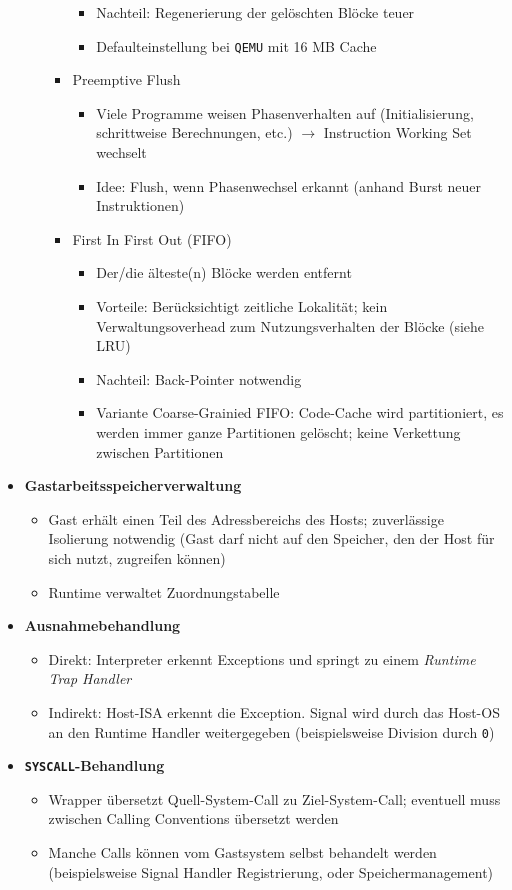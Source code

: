 \begin{itemize}
\begin{itemize}
\begin{itemize}
\begin{itemize}
				\item Nachteil: Regenerierung der gelöschten Blöcke teuer
				\item Defaulteinstellung bei \texttt{QEMU} mit 16 MB Cache
			\end{itemize}
			\item Preemptive Flush
			\begin{itemize}
				\item Viele Programme weisen Phasenverhalten auf (Initialisierung, schrittweise Berechnungen, etc.) \(\rightarrow\) Instruction Working Set wechselt
				\item Idee: Flush, wenn Phasenwechsel erkannt (anhand Burst neuer Instruktionen)
			\end{itemize}
			\item First In First Out (FIFO)
			\begin{itemize}
				\item Der/die älteste(n) Blöcke werden entfernt
				\item Vorteile: Berücksichtigt zeitliche Lokalität; kein Verwaltungsoverhead zum Nutzungsverhalten der Blöcke (siehe LRU)
				\item Nachteil: Back-Pointer notwendig
				\item Variante Coarse-Grainied FIFO: Code-Cache wird partitioniert, es werden immer ganze Partitionen gelöscht; keine Verkettung zwischen Partitionen
			\end{itemize}
		\end{itemize}
	\end{itemize}
	\item \textbf{Gastarbeitsspeicherverwaltung}
	\begin{itemize}
		\item Gast erhält einen Teil des Adressbereichs des Hosts; zuverlässige Isolierung notwendig (Gast darf nicht auf den Speicher, den der Host für sich nutzt, zugreifen können)
		\item Runtime verwaltet Zuordnungstabelle
	\end{itemize}
	\item \textbf{Ausnahmebehandlung}
	\begin{itemize}
		\item Direkt: Interpreter erkennt Exceptions und springt zu einem \textit{Runtime Trap Handler}
		\item Indirekt: Host-ISA erkennt die Exception. Signal wird durch das Host-OS an den Runtime Handler weitergegeben (beispielsweise Division durch \texttt{0})
	\end{itemize}
	\item \textbf{\texttt{SYSCALL}-Behandlung}
	\begin{itemize}
		\item Wrapper übersetzt Quell-System-Call zu Ziel-System-Call; eventuell muss zwischen Calling Conventions übersetzt werden
		\item Manche Calls können vom Gastsystem selbst behandelt werden (beispielsweise Signal Handler Registrierung, oder Speichermanagement)
	\end{itemize}
\end{itemize}



